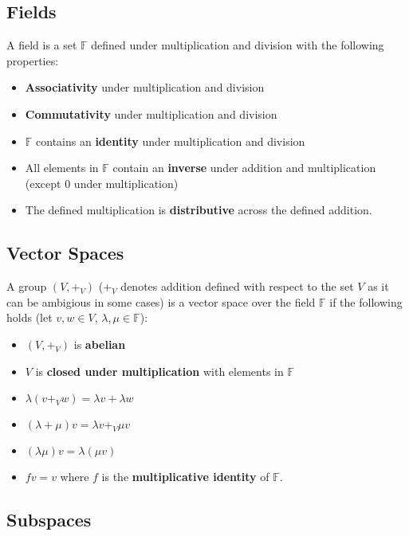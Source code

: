 \documentclass[a4paper, 12pt, twoside]{article}
\begin{document}
\subsection{Fields}

A field is a set $\mathbb{F}$ defined under multiplication and division with the
following properties:

\begin{itemize}
  \item \textbf{Associativity} under multiplication and division
  \item \textbf{Commutativity} under multiplication and division
  \item $\mathbb{F}$ contains an \textbf{identity} under multiplication and division
  \item All elements in $\mathbb{F}$ contain an \textbf{inverse} under addition and
        multiplication (except $0$ under multiplication)
  \item The defined multiplication is \textbf{distributive} across
        the defined addition.
\end{itemize}

\subsection{Vector Spaces}

A group $(V, +_{V})$ ($+_{V}$ denotes addition defined with respect to the
set $V$ as it can be ambigious in some cases) is a vector space over the field
$\mathbb{F}$ if the following holds (let $v, w \in V$, $\lambda, \mu \in
  \mathbb{F}$):

\begin{itemize}
  \item $(V, +_{V})$ is \textbf{abelian}
  \item $V$ is \textbf{closed under multiplication} with elements in
        $\mathbb{F}$
  \item $\lambda(v +_{V} w) = \lambda v + \lambda w$
  \item $(\lambda + \mu)v = \lambda v +_{V} \mu v$
  \item $(\lambda \mu)v = \lambda (\mu v)$
  \item $fv = v$ where $f$ is the \textbf{multiplicative identity} of
        $\mathbb{F}$.
\end{itemize}

\subsection{Subspaces}
\end{document}
